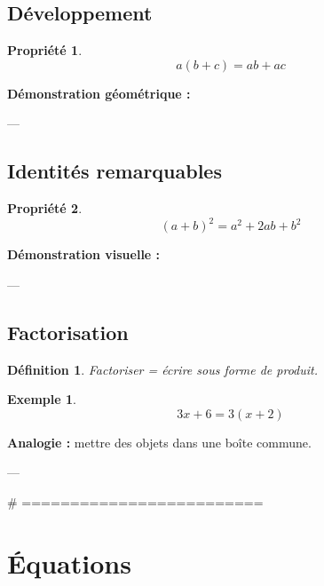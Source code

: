 \documentclass[11pt,a4paper]{article}
\newtheorem{definition}{Définition}
\newtheorem{property}{Propriété}
\newtheorem{example}{Exemple}
\begin{document}
\subsection{Développement}

\begin{property}
\[
a(b+c) = ab + ac
\]
\end{property}

\textbf{Démonstration géométrique :}

\begin{center}
\end{center}

---

\subsection{Identités remarquables}

\begin{property}
\[
(a+b)^2 = a^2 + 2ab + b^2
\]
\end{property}

\textbf{Démonstration visuelle :}

\begin{center}
\end{center}

---

\subsection{Factorisation}

\begin{definition}
Factoriser = écrire sous forme de produit.
\end{definition}

\begin{example}
\[
3x + 6 = 3(x+2)
\]
\end{example}

\textbf{Analogie :}  
mettre des objets dans une boîte commune.

---

# =========================
\section{Équations}
\end{document}
